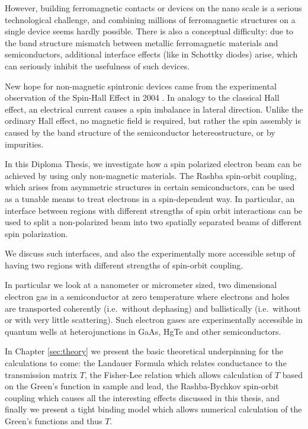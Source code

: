However, building ferromagnetic contacts or devices on
the nano scale is a serious technological challenge, and combining millions of
ferromagnetic structures on a single device seems hardly possible. There is
also a conceptual difficulty: due to the band structure mismatch between
metallic ferromagnetic materials and semiconductors, additional interface
effects (like in Schottky diodes) arise, which can seriously inhibit the
usefulness of such devices.

New hope for non-magnetic spintronic devices came from the experimental
observation of the Spin-Hall Effect in 2004 \cite{SHE}. In analogy to the
classical Hall effect, an electrical current causes a spin imbalance in
lateral direction. Unlike the ordinary Hall effect, no magnetic field is
required, but rather the spin assembly is caused by the band
structure of the semiconductor hetereostructure, or by impurities.

In this Diploma Thesis, we investigate how a spin polarized electron
beam can be achieved by using only non-magnetic materials. The Rashba 
spin-orbit coupling, which arises from
asymmetric structures in certain semiconductors, can be used as a tunable
means to treat
electrons in a spin-dependent way. In particular, an interface
between regions with different strengths of spin orbit interactions can be
used to split a non-polarized beam into two spatially separated beams of
different spin polarization.

We discuss such interfaces, and also the experimentally more accessible setup
of having two regions with different strengths of spin-orbit coupling.

In particular we look at a nanometer or micrometer sized, two dimensional
electron gas in a semiconductor at zero temperature where electrons and holes
are transported coherently (i.e.~without dephasing) and ballistically
(i.e.~without or with very little scattering). Such electron gases are
experimentally accessible in quantum wells at heterojunctions in GaAs,
HgTe and other semiconductors.

In Chapter \ref{sec:theory} we present the basic theoretical underpinning for
the calculations to come: the Landauer Formula which relates conductance to
the transmission matrix $T$, the Fisher-Lee relation which allows calculation
of $T$ based on the Green's function in sample and lead, the Rashba-Bychkov
spin-orbit coupling which causes all the interesting effects discussed in this
thesis, and finally we present a tight binding model which allows numerical
calculation of the Green's functions and thus $T$.

